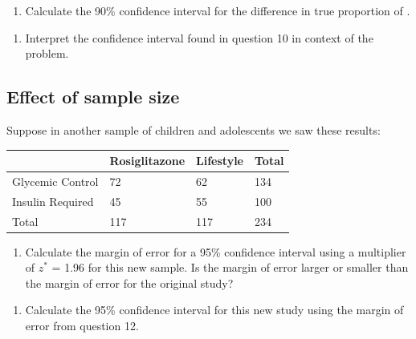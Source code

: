\documentclass[
]{report}
\providecommand{\tightlist}{%
  \setlength{\itemsep}{0pt}\setlength{\parskip}{0pt}}
\begin{document}
\vspace{0.5in}

\begin{enumerate}
\def\labelenumi{\arabic{enumi}.}
\setcounter{enumi}{9}
\tightlist
\item
  Calculate the 90\% confidence interval for the difference in true proportion of .
\end{enumerate}

\vspace{1in}

\begin{enumerate}
\def\labelenumi{\arabic{enumi}.}
\setcounter{enumi}{10}
\tightlist
\item
  Interpret the confidence interval found in question 10 in context of the problem.
\end{enumerate}

\vspace{1in}

\hypertarget{effect-of-sample-size-1}{%
\subsection{Effect of sample size}\label{effect-of-sample-size-1}}

Suppose in another sample of children and adolescents we saw these results:

\begin{longtable}[]{@{}llll@{}}
\toprule
& Rosiglitazone & Lifestyle & Total \\
\midrule
\endhead
Glycemic Control & 72 & 62 & 134 \\
Insulin Required & 45 & 55 & 100 \\
Total & 117 & 117 & 234 \\
\bottomrule
\end{longtable}

\begin{enumerate}
\def\labelenumi{\arabic{enumi}.}
\setcounter{enumi}{11}
\tightlist
\item
  Calculate the margin of error for a 95\% confidence interval using a multiplier of \(z^*\) = 1.96 for this new sample. Is the margin of error larger or smaller than the margin of error for the original study?
\end{enumerate}

\vspace{.8in}

\begin{enumerate}
\def\labelenumi{\arabic{enumi}.}
\setcounter{enumi}{12}
\tightlist
\item
  Calculate the 95\% confidence interval for this new study using the margin of error from question 12.
\end{enumerate}
\end{document}
